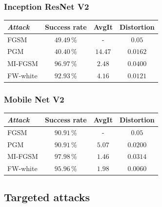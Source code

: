 \documentclass[10pt,twocolumn,letterpaper, english]{article}
\theoremstyle{definition}
\theoremstyle{plain}
\theoremstyle{plain}
\theoremstyle{plain}
\theoremstyle{plain}
\theoremstyle{remark}
\theoremstyle{remark}
\theoremstyle{definition}
\theoremstyle{definition}
\theoremstyle{definition}
\theoremstyle{definition}
\begin{document}
\subsubsection{Inception ResNet V2}

\begin{center}
    

\begin{tabular}{ |l|c|c|c| }
 \hline
  \textit{Attack} & Success rate & AvgIt & Distortion \\
 \hline
 
 FGSM   & $49.49\,\%$   &  - & $0.05$\\
 PGM&   $40.40\,\%$  & $14.47$  & $0.0162$ \\
 MI-FGSM & $96.97\,\%$ & $2.48$ & $0.0400$\\
 FW-white & $92.93\,\%$ & $4.16$ & $0.0121$\\
\hline
\end{tabular}
\end{center}

\subsubsection{Mobile Net V2}

\begin{center}
    
\begin{tabular}{ |l|c|c|c| }
 \hline
  \textit{Attack} & Success rate & AvgIt & Distortion \\
 \hline
 
 FGSM   & $90.91\,\%$   &  - & $0.05$\\
 PGM&   $90.91\,\%$  & $5.07$  & $0.0200$ \\
 MI-FGSM & $97.98\,\%$ & $1.46$ & $0.0314$\\
 FW-white & $95.96\,\%$ & $1.98$ & $0.0060$\\
\hline
\end{tabular}
\end{center}

\subsection{Targeted attacks}


 
\end{document}
